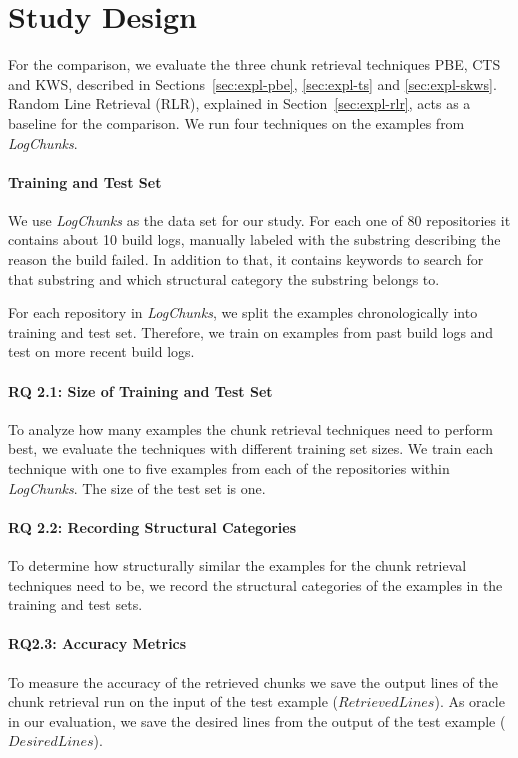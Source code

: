 \documentclass[\myrootdir/main.tex]{subfiles}
\begin{document}
\section{Study Design}
For the comparison, we evaluate the three chunk retrieval techniques PBE, CTS and KWS, described in Sections~\ref{sec:expl-pbe}, \ref{sec:expl-ts} and \ref{sec:expl-skws}.
Random Line Retrieval (RLR), explained in Section~\ref{sec:expl-rlr}, acts as a baseline for the comparison.
We run four techniques on the examples from \emph{LogChunks}.
\paragraph{Training and Test Set}
We use \emph{LogChunks} as the data set for our study.
For each one of 80 repositories it contains about 10 build logs, manually labeled with the substring describing the reason the build failed.
In addition to that, it contains keywords to search for that substring and which structural category the substring belongs to.

For each repository in \emph{LogChunks}, we split the examples chronologically into training and test set.
Therefore, we train on examples from past build logs and test on more recent build logs.

\paragraph{RQ 2.1: Size of Training and Test Set}
To analyze how many examples the chunk retrieval techniques need to perform best, we evaluate the techniques with different training set sizes.
We train each technique with one to five examples from each of the repositories within \emph{LogChunks}.
The size of the test set is one.

\paragraph{RQ 2.2: Recording Structural Categories}
To determine how structurally similar the examples for the chunk retrieval techniques need to be, we record the structural categories of the examples in the training and test sets.

\paragraph{RQ2.3: Accuracy Metrics}
To measure the accuracy of the retrieved chunks we save the output lines of the chunk retrieval run on the input of the test example ($\mathit{RetrievedLines}$).
As oracle in our evaluation, we save the desired lines from the output of the test example ($\mathit{DesiredLines}$).
\end{document}
